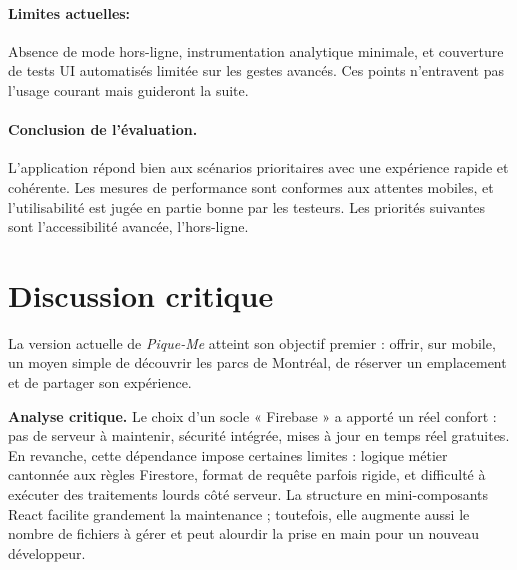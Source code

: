 \documentclass[12pt,a4paper]{article}
\begin{document}
\paragraph{Limites actuelles:}
Absence de mode hors-ligne, instrumentation analytique minimale, et couverture de tests UI automatisés limitée sur les gestes avancés. Ces points n’entravent pas l’usage courant mais guideront la suite.

\paragraph{Conclusion de l’évaluation.}
L’application répond bien aux scénarios prioritaires avec une expérience rapide et cohérente. Les mesures de performance sont conformes aux attentes mobiles, et l’utilisabilité est jugée en partie bonne par les testeurs. Les priorités suivantes sont l’accessibilité avancée, l’hors-ligne.



\clearpage
\section{Discussion critique}

La version actuelle de \textit{Pique-Me} atteint son objectif premier :
offrir, sur mobile, un moyen simple de découvrir les parcs de Montréal,
de réserver un emplacement et de partager son expérience. 

\medskip\noindent
\textbf{Analyse critique.}  
Le choix d'un socle « Firebase » a apporté un réel confort : pas de
serveur à maintenir, sécurité intégrée, mises à jour en temps réel
gratuites. En revanche, cette dépendance impose certaines limites :
logique métier cantonnée aux règles Firestore, format de requête parfois
rigide, et difficulté à exécuter des traitements lourds côté serveur. La structure en mini-composants
React facilite grandement la maintenance ; toutefois, elle augmente
aussi le nombre de fichiers à gérer et peut alourdir la prise en main
pour un nouveau développeur.
\end{document}
